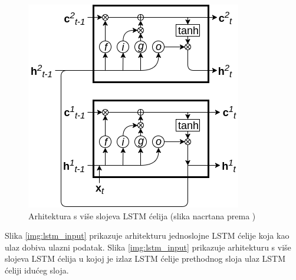 \documentclass[times, utf8, diplomski, numeric]{fer}
\begin{document}
\begin{figure}[H]
\centering
\includegraphics[scale=0.7]{images/lstm_hidden.png}
\caption{Arhitektura s više slojeva LSTM ćelija (slika nacrtana prema \citep{article:lstm})}
\label{img:lstm_hidden}
\end{figure}

Slika \ref{img:lstm_input} prikazuje arhitekturu jednoslojne LSTM ćelije koja kao ulaz dobiva ulazni podatak. 
Slika \ref{img:lstm_input} prikazuje arhitekturu s više slojeva LSTM ćelija u kojoj je izlaz LSTM ćelije prethodnog sloja ulaz LSTM ćeliji idućeg sloja.
\end{document}
